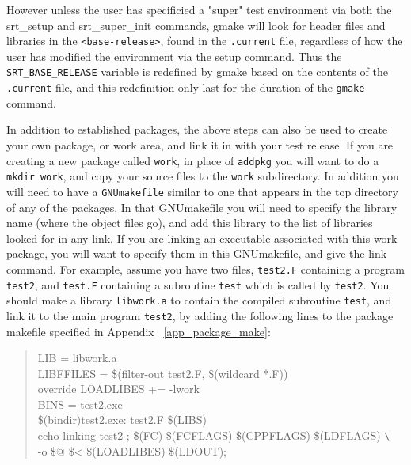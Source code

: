 \documentclass[12pt]{article}
\begin{document}
However unless the user has specificied a "super" test environment via 
both the srt\_setup and srt\_super\_init commands, gmake will look for header files and 
libraries in the \texttt{<base-release>}, found in the \texttt{.current} file, 
regardless of how the user has modified the environment via the setup command.
Thus the \texttt{SRT\_BASE\_RELEASE} variable is redefined by gmake
based on the contents of the \texttt{.current} file, and this redefinition only last
for the duration of the \texttt{gmake} command.

In addition to established packages, the above steps can also be used to create 
your own package, or work area, and link it in with your test release.  If you 
are creating a new package called \texttt{work}, in place of \texttt{addpkg} 
you will want to do a \texttt{mkdir work}, and copy your source files to the 
\texttt{work} subdirectory.  In addition you will need to have 
a \texttt{GNUmakefile} similar to one that appears in the top directory of any 
of the packages.  In that GNUmakefile you will need to specify the library
name (where the object files go), and add this library to the list of libraries
looked for in any link. If you are linking an executable associated
with this work package, you will want to specify them in this GNUmakefile,
and give the link command.  For example, assume you have two files, \texttt{test2.F}
containing a program \texttt{test2}, and \texttt{test.F} containing a 
subroutine \texttt{test} which is called by \texttt{test2}.
You should make a library \texttt{libwork.a} to contain the compiled subroutine 
\texttt{test}, and link it to the main program \texttt{test2}, by 
adding the following lines to the package makefile specified in 
Appendix ~\ref{app_package_make}:
\begin{quote}
\ttfamily
LIB = libwork.a  \\
LIBFFILES  = \$(filter-out test2.F, \$(wildcard *.F))  \\
override LOADLIBES += -lwork                         \\ 
BINS = test2.exe                                     \\
\$(bindir)test2.exe: test2.F \$(LIBS)                \\
\hspace*{0.3in} echo linking test2 ; \$(FC) \$(FCFLAGS) \$(CPPFLAGS) \$(LDFLAGS) \verb+\+ \\
\hspace*{0.3in} -o \$@ \$< \$(LOADLIBES) \$(LDOUT);\\
\end{quote} 
\end{document}
